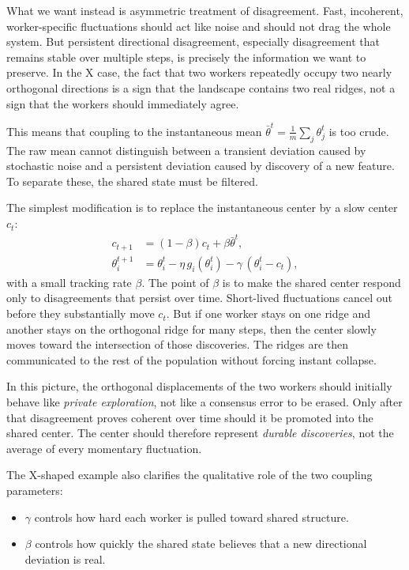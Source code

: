 \documentclass{article}
\begin{document}
What we want instead is asymmetric treatment of disagreement. Fast,
incoherent, worker-specific fluctuations should act like noise and
should not drag the whole system. But persistent directional
disagreement, especially disagreement that remains stable over multiple
steps, is precisely the information we want to preserve. In the X case,
the fact that two workers repeatedly occupy two nearly orthogonal
directions is a sign that the landscape contains two real ridges, not a
sign that the workers should immediately agree.

This means that coupling to the instantaneous mean
$\bar{\theta}^t = \frac{1}{m}\sum_j \theta_j^t$ is too crude. The raw
mean cannot distinguish between a transient deviation caused by
stochastic noise and a persistent deviation caused by discovery of a new
feature. To separate these, the shared state must be filtered.

The simplest modification is to replace the instantaneous center by a
slow center $c_t$:
\begin{align}
c_{t+1} &= (1-\beta)c_t + \beta \bar{\theta}^t, \\
\theta_i^{t+1} &= \theta_i^t - \eta\, g_i(\theta_i^t)
  - \gamma\,(\theta_i^t - c_t),
\end{align}
with a small tracking rate $\beta$. The point of $\beta$ is to make the
shared center respond only to disagreements that persist over time.
Short-lived fluctuations cancel out before they substantially move
$c_t$. But if one worker stays on one ridge and another stays on the
orthogonal ridge for many steps, then the center slowly moves toward the
intersection of those discoveries. The ridges are then communicated to
the rest of the population without forcing instant collapse.

In this picture, the orthogonal displacements of the two workers should
initially behave like \emph{private exploration}, not like a consensus
error to be erased. Only after that disagreement proves coherent over
time should it be promoted into the shared center. The center should
therefore represent \emph{durable discoveries}, not the average of every
momentary fluctuation.

The X-shaped example also clarifies the qualitative role of the two
coupling parameters:
\begin{itemize}
\item $\gamma$ controls how hard each worker is pulled toward shared
  structure.
\item $\beta$ controls how quickly the shared state believes that a new
  directional deviation is real.
\end{itemize}
\end{document}
